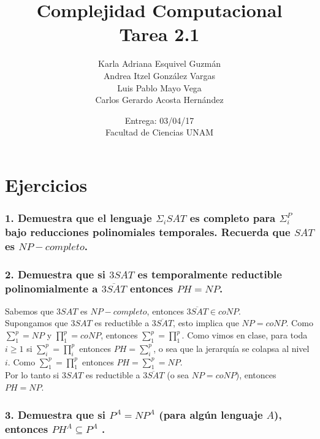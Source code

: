 \documentclass[12pt]{article}
\title{Complejidad Computacional \\ Tarea 2.1}
\author{Karla Adriana Esquivel Guzmán \\ Andrea Itzel González Vargas\\ Luis Pablo Mayo Vega \\ Carlos Gerardo Acosta Hernández}
\date{Entrega: 03/04/17 \\ Facultad de Ciencias UNAM}
\begin{document}
\maketitle
\section*{Ejercicios}
\subsubsection*{1. Demuestra que el lenguaje $\Sigma_iSAT$ es completo para $\Sigma^P_i$ bajo reducciones polinomiales
temporales. Recuerda que $SAT$ es $NP-completo$.}
\subsubsection*{2. Demuestra que si $3SAT$ es temporalmente reductible polinomialmente a $\overline{3SAT}$ entonces $PH = NP$.}
Sabemos que $3SAT$ es $NP-completo$, entonces $\overline{3SAT} \in coNP$. \\
Supongamos que $3SAT$ es reductible a $\overline{3SAT}$, esto implica que $NP = coNP$. Como $\sum_1^p = NP$ y $\prod_1^p = coNP$, entonces $\sum_1^p = \prod_1^p$. Como vimos en clase, para toda $i \geq 1$ si $\sum_i^p = \prod_i^p$ entonces $PH = \sum_i^p$, o sea que la jerarquía se colapsa al nivel $i$. Como $\sum_1^p = \prod_1^p$ entonces $PH = \sum_1^p = NP$. \\
Por lo tanto si $3SAT$ es reductible a $\overline{3SAT}$ (o sea $NP = coNP$), entonces $PH = NP$.

\subsubsection*{3. Demuestra que si $P^A = NP^A$ (para algún lenguaje $A$), entonces $PH^A \subseteq P^A$ .}
\end{document}
